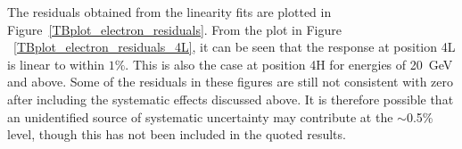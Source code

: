 The residuals obtained from the linearity fits are plotted in Figure~\ref{TBplot_electron_residuals}. From the plot in Figure ~\ref{TBplot_electron_residuals_4L}, it can be seen that the response at position 4L is linear to within $1\%$. This is also the case at position 4H for energies of 20~GeV and above.  Some of the residuals in these figures are still not consistent with zero after including the systematic effects discussed above. It is therefore possible that an unidentified source of systematic uncertainty may contribute at the $\sim$0.5\% level, though this has not been included in the quoted results.

%



